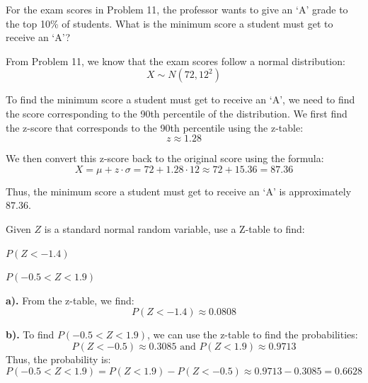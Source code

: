 \documentclass[a4paper, 10pt]{article}
\begin{document}


\begin{problem}
For the exam scores in Problem 11, the professor wants to give an `A' grade to the top 10\% of students.
What is the minimum score a student must get to receive an `A'?
\end{problem}

\begin{solution}
From Problem 11, we know that the exam scores follow a normal distribution: \[ X \sim N(72, 12^2) \]

To find the minimum score a student must get to receive an `A',
we need to find the score corresponding to the 90th percentile of the distribution.
We first find the z-score that corresponds to the 90th percentile using the z-table: \[ z \approx 1.28 \]

We then convert this z-score back to the original score using the formula:
\[ X = \mu + z \cdot \sigma = 72 + 1.28 \cdot 12 \approx 72 + 15.36 = 87.36 \]

Thus, the minimum score a student must get to receive an `A' is approximately \( \boxed{87.36} \).
\end{solution}


\begin{problem}
Given \( Z \) is a standard normal random variable, use a Z-table to find:
\begin{subproblems}
    \item \( P(Z < -1.4) \)
    \item \( P(-0.5 < Z < 1.9) \)
\end{subproblems}
\end{problem}

\begin{solution}
\textbf{a).} From the z-table, we find:
\[ P(Z < -1.4) \approx \boxed{0.0808} \]

\textbf{b).} To find \( P(-0.5 < Z < 1.9) \), we can use the z-table to find the probabilities:
\[ P(Z < -0.5) \approx 0.3085 \text{ and } P(Z < 1.9) \approx 0.9713 \]
Thus, the probability is:
\[ P(-0.5 < Z < 1.9) = P(Z < 1.9) - P(Z < -0.5) \approx 0.9713 - 0.3085 = \boxed{0.6628} \]
\end{solution}
\end{document}
